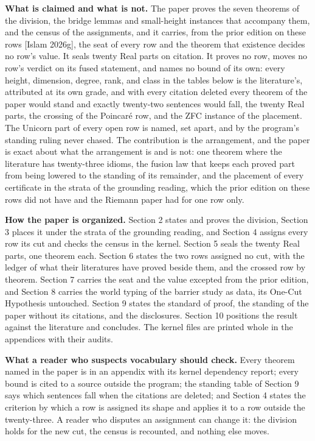 \documentclass[10pt]{article}
\begin{document}
\textbf{What is claimed and what is not.} The paper proves the seven
theorems of the division, the bridge lemmas and small-height instances
that accompany them, and the census of the assignments, and it carries,
from the prior edition on these rows {[}Islam 2026g{]}, the seat of
every row and the theorem that existence decides no row's value. It
seals twenty Real parts on citation. It proves no row, moves no row's
verdict on its fused statement, and names no bound of its own: every
height, dimension, degree, rank, and class in the tables below is the
literature's, attributed at its own grade, and with every citation
deleted every theorem of the paper would stand and exactly twenty-two
sentences would fall, the twenty Real parts, the crossing of the
Poincaré row, and the ZFC instance of the placement. The Unicorn part of
every open row is named, set apart, and by the program's standing ruling
never chased. The contribution is the arrangement, and the paper is
exact about what the arrangement is and is not: one theorem where the
literature has twenty-three idioms, the fusion law that keeps each
proved part from being lowered to the standing of its remainder, and the
placement of every certificate in the strata of the grounding reading,
which the prior edition on these rows did not have and the Riemann paper
had for one row only.

\textbf{How the paper is organized.} Section 2 states and proves the
division, Section 3 places it under the strata of the grounding reading,
and Section 4 assigns every row its cut and checks the census in the
kernel. Section 5 seals the twenty Real parts, one theorem each. Section
6 states the two rows assigned no cut, with the ledger of what their
literatures have proved beside them, and the crossed row by theorem.
Section 7 carries the seat and the value excepted from the prior
edition, and Section 8 carries the world typing of the barrier study as
data, its One-Cut Hypothesis untouched. Section 9 states the standard of
proof, the standing of the paper without its citations, and the
disclosures. Section 10 positions the result against the literature and
concludes. The kernel files are printed whole in the appendices with
their audits.

\textbf{What a reader who suspects vocabulary should check.} Every
theorem named in the paper is in an appendix with its kernel dependency
report; every bound is cited to a source outside the program; the
standing table of Section 9 says which sentences fall when the citations
are deleted; and Section 4 states the criterion by which a row is
assigned its shape and applies it to a row outside the twenty-three. A
reader who disputes an assignment can change it: the division holds for
the new cut, the census is recounted, and nothing else moves.
\end{document}
